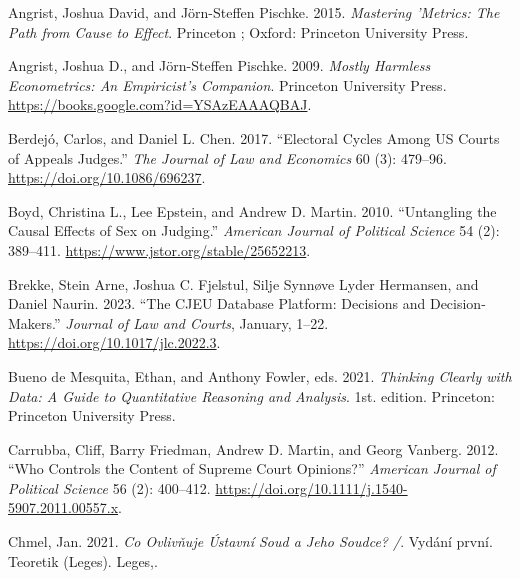 \documentclass[
  11pt,
]{article}
\newlength{\cslhangindent}
\newenvironment{CSLReferences}[2] %
 {%
  \setlength{\parindent}{0pt}
  \ifodd #1 \everypar{\setlength{\hangindent}{\cslhangindent}}\ignorespaces\fi
  \ifnum #2 > 0
  \setlength{\parskip}{#2\baselineskip}
  \fi
 }%
 {}
\begin{document}
\hypertarget{refs}{}
\begin{CSLReferences}{1}{0}
\leavevmode{}%
Angrist, Joshua David, and Jörn-Steffen Pischke. 2015. \emph{Mastering
'Metrics: The Path from Cause to Effect}. {Princeton ; Oxford}:
{Princeton University Press}.

\leavevmode{}%
Angrist, Joshua D., and Jörn-Steffen Pischke. 2009. \emph{Mostly
{Harmless Econometrics}: {An Empiricist}'s {Companion}}. {Princeton
University Press}. \url{https://books.google.com?id=YSAzEAAAQBAJ}.

\leavevmode{}%
Berdejó, Carlos, and Daniel L. Chen. 2017. {``Electoral {Cycles} Among
{US Courts} of {Appeals Judges}.''} \emph{The Journal of Law and
Economics} 60 (3): 479--96. \url{https://doi.org/10.1086/696237}.

\leavevmode{}%
Boyd, Christina L., Lee Epstein, and Andrew D. Martin. 2010.
{``Untangling the {Causal Effects} of {Sex} on {Judging}.''}
\emph{American Journal of Political Science} 54 (2): 389--411.
\url{https://www.jstor.org/stable/25652213}.

\leavevmode{}%
Brekke, Stein Arne, Joshua C. Fjelstul, Silje Synnøve Lyder Hermansen,
and Daniel Naurin. 2023. {``The {CJEU Database Platform}: {Decisions}
and {Decision-Makers}.''} \emph{Journal of Law and Courts}, January,
1--22. \url{https://doi.org/10.1017/jlc.2022.3}.

\leavevmode{}%
Bueno de Mesquita, Ethan, and Anthony Fowler, eds. 2021. \emph{Thinking
Clearly with Data: A Guide to Quantitative Reasoning and Analysis}. 1st.
edition. {Princeton}: {Princeton University Press}.

\leavevmode{}%
Carrubba, Cliff, Barry Friedman, Andrew D. Martin, and Georg Vanberg.
2012. {``Who {Controls} the {Content} of {Supreme Court Opinions}?''}
\emph{American Journal of Political Science} 56 (2): 400--412.
\url{https://doi.org/10.1111/j.1540-5907.2011.00557.x}.

\leavevmode{}%
Chmel, Jan. 2021. \emph{Co Ovlivňuje {Ústavní} Soud a Jeho Soudce? /}.
Vydání první. Teoretik ({Leges}). {Leges,}.


\end{CSLReferences}
\end{document}
